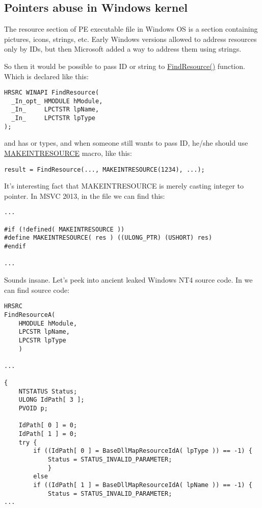 \subsection{Pointers abuse in Windows kernel}

The resource section of PE executable file in Windows OS is a section containing pictures, icons, strings, etc.
Early Windows versions allowed to address resources only by IDs, but then Microsoft added a way to address them using strings.

So then it would be possible to pass ID or string to 
\href{https://msdn.microsoft.com/en-us/library/windows/desktop/ms648042%28v=vs.85%29.aspx}{FindResource()} function.
Which is declared like this:

\begin{lstlisting}
HRSRC WINAPI FindResource(
  _In_opt_ HMODULE hModule,
  _In_     LPCTSTR lpName,
  _In_     LPCTSTR lpType
);
\end{lstlisting}

 and  has  or  types, and when someone still wants to pass ID, he/she should use
\href{https://msdn.microsoft.com/en-us/library/windows/desktop/ms648029%28v=vs.85%29.aspx}{MAKEINTRESOURCE} macro, like this:

\begin{lstlisting}
result = FindResource(..., MAKEINTRESOURCE(1234), ...);
\end{lstlisting}

It's interesting fact that MAKEINTRESOURCE is merely casting integer to pointer.
In MSVC 2013, in the file  we can find this:

\begin{lstlisting}
...

#if (!defined( MAKEINTRESOURCE )) 
#define MAKEINTRESOURCE( res ) ((ULONG_PTR) (USHORT) res)
#endif

...
\end{lstlisting}

Sounds insane. Let's peek into ancient leaked Windows NT4 source code.
In  we can find  source code:

\begin{lstlisting}
HRSRC
FindResourceA(
    HMODULE hModule,
    LPCSTR lpName,
    LPCSTR lpType
    )

...

{
    NTSTATUS Status;
    ULONG IdPath[ 3 ];
    PVOID p;

    IdPath[ 0 ] = 0;
    IdPath[ 1 ] = 0;
    try {
        if ((IdPath[ 0 ] = BaseDllMapResourceIdA( lpType )) == -1) {
            Status = STATUS_INVALID_PARAMETER;
            }
        else
        if ((IdPath[ 1 ] = BaseDllMapResourceIdA( lpName )) == -1) {
            Status = STATUS_INVALID_PARAMETER;
...
\end{lstlisting}

